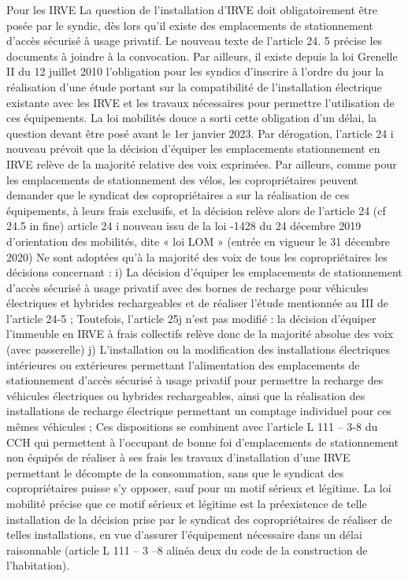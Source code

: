 				Pour les IRVE
				La question de l’installation d’IRVE doit obligatoirement être posée par le syndic, dès lors qu’il existe des emplacements de stationnement d’accès sécurisé à usage privatif. Le nouveau texte de l’article 24. 5 précise les documents à joindre à la convocation.
				Par ailleurs, il existe depuis la loi Grenelle II du 12 juillet 2010 l’obligation pour les syndics d’inscrire à l’ordre du jour la réalisation d’une étude portant sur la compatibilité de l’installation électrique existante avec les IRVE et les travaux nécessaires pour permettre l’utilisation de ces équipements. La loi mobilités douce a sorti cette obligation d’un délai, la question devant être posé avant le 1er janvier 2023.
				Par dérogation, l’article 24 i nouveau prévoit que la décision d’équiper les emplacements stationnement en IRVE relève de la majorité relative des voix exprimées. Par ailleurs, comme pour les emplacements de stationnement des vélos, les copropriétaires peuvent demander que le syndicat des copropriétaires a sur la réalisation de ces équipements, à leurs frais exclusifs, et la décision relève alors de l’article 24 (cf 24.5 in fine)
				article 24 i nouveau issu de la loi -1428 du 24 décembre 2019 d’orientation des mobilités, dite « loi LOM » (entrée en vigueur le 31 décembre 2020)
				Ne sont adoptées qu'à la majorité des voix de tous les copropriétaires les décisions concernant :
				i) La décision d'équiper les emplacements de stationnement d'accès sécurisé à usage privatif avec des bornes de recharge pour véhicules électriques et hybrides rechargeables et de réaliser l'étude mentionnée au III de l'article 24-5 ;
				Toutefois, l’article 25j n’est pas modifié : la décision d’équiper l’immeuble en IRVE à frais collectifs relève donc de la majorité absolue des voix (avec passerelle)
				j) L'installation ou la modification des installations électriques intérieures ou extérieures permettant l'alimentation des emplacements de stationnement d'accès sécurisé à usage
				privatif pour permettre la recharge des véhicules électriques ou hybrides rechargeables, ainsi que la réalisation des installations de recharge électrique permettant un comptage individuel pour ces mêmes véhicules ;
				Ces dispositions se combinent avec l’article L 111 – 3-8 du CCH qui permettent à l'occupant de bonne foi d'emplacements de stationnement non équipés de réaliser à ses frais les travaux d’installation d’une IRVE permettant le décompte de la consommation, sans que le syndicat des copropriétaires puisse s’y opposer, sauf pour un motif sérieux et légitime.
				La loi mobilité précise que ce motif sérieux et légitime est la préexistence de telle installation de la décision prise par le syndicat des copropriétaires de réaliser de telles installations, en vue d’assurer l’équipement nécessaire dans un délai raisonnable (article L 111 – 3 –8 alinéa deux du code de la construction de l’habitation).
